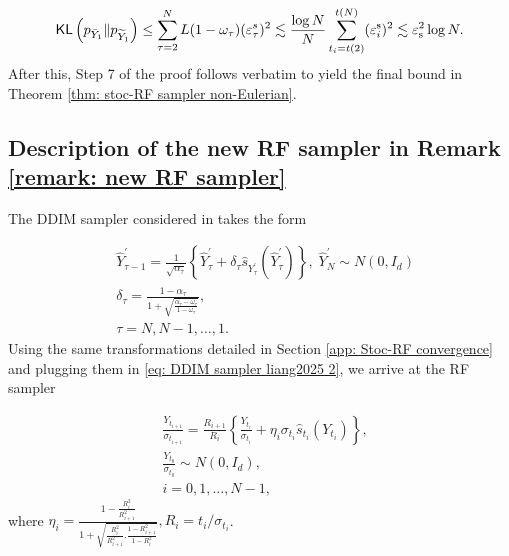 \documentclass{article}
\theoremstyle{plain}
\theoremstyle{definition}
\theoremstyle{remark}
\def\KL{{\sf KL}}
\def\escore{\varepsilon^{\rm s}}
\def\meanescore{\varepsilon_{\rm s}}
\newcommand{\bc}[1]{\left\{{#1}\right\}}
\newcommand{\br}[1]{\left({#1}\right)}
\begin{document}
 \[
 \KL\br{p_{\bar Y_1} \| p_{\widetilde{Y}_1} } \le \sum_{\tau = 2}^N L(1 - \omega_\tau) (\varepsilon_\tau^s)^2 \lesssim \frac{\log N}{N}\sum_{t_i = t(2)}^{t(N)} (\escore_i)^2 \lesssim  \meanescore^2 \log N.
 \]
 After this, Step 7 of the proof follows verbatim to yield the final bound in Theorem \ref{thm: stoc-RF sampler non-Eulerian}.


\subsection{Description of the new RF sampler in Remark \ref{remark: new RF sampler}}
\label{app: new RF sampler}
The DDIM sampler considered in \citet{liang2025low} takes the form

\begin{equation}
    \label{eq: DDIM sampler liang2025 2}
    \begin{aligned}
    & \hat Y^\prime_{\tau -1} = \frac{1}{\sqrt{\alpha_\tau}} \bc{ \hat Y^\prime_\tau + \delta_\tau \widehat s_{Y^\prime_\tau}(\hat Y^\prime_\tau)}, \; \hat Y^\prime_N \sim N(0, I_d)\\
    & \delta_\tau = \frac{1 - \alpha_\tau}{1 + \sqrt{\frac{\alpha_\tau - \omega_\tau}{1 - \omega_\tau}}},\\
    & \tau   = N , N-1, \ldots, 1.
    \end{aligned}
\end{equation}
Using the same transformations detailed in Section \ref{app: Stoc-RF convergence} and plugging them in \eqref{eq: DDIM sampler liang2025 2}, we arrive at the RF sampler

\begin{equation}
     \label{eq: DDIM sampler non-Eulerian}
     \begin{aligned}
      &\frac{Y_{t_{i+1}}}{\sigma_{t_{i+1}}} = \frac{R_{i+1}}{R_i} \bc{ \frac{Y_{t_i}}{\sigma_{t_i}} + \eta_i \sigma_{t_i} \widehat s_{t_i}(Y_{t_i}) },\\
      &  \frac{Y_{t_0}}{\sigma_{t_0}} \sim N(0,  I_d),\\
      & i = 0, 1, \ldots, N-1,
     \end{aligned}
 \end{equation}
where $\eta_i = \frac{1 - \frac{R_i^2}{R_{i+1}^2}}{1 + \sqrt{\frac{R_i^2}{R_{i+1}^2}. \frac{1 - R_{i+1}^2}{1 -  R_{i}^2}}}, R_i = t_i/\sigma_{t_i}$. 
\end{document}
